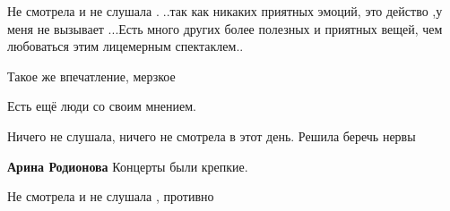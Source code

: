 \begin{itemize}
 

Не смотрела и не слушала .🤨..так как никаких приятных эмоций, это действо ,у
меня не вызывает ...Есть много других более полезных и приятных вещей, чем
любоваться этим лицемерным спектаклем..


 
Такое же впечатление, мерзкое

 
Есть ещё люди со своим мнением.

 
Ничего не слушала, ничего не смотрела в этот день. Решила беречь нервы

\begin{itemize}
 
\textbf{Арина Родионова} Концерты были крепкие.

\end{itemize}

 
Не смотрела и не слушала , противно


\end{itemize}
